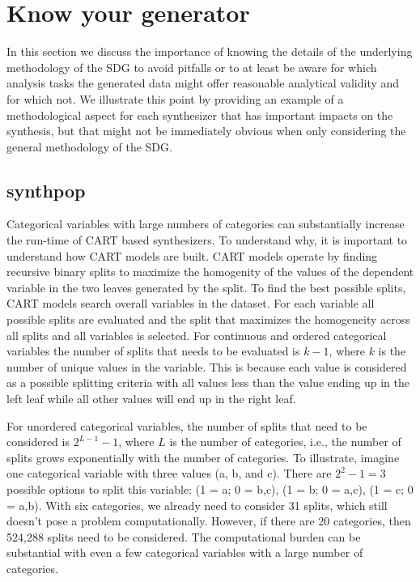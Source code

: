\documentclass[runningheads]{llncs}
\begin{document}
\section{Know your generator}\label{sec:know_your_generator}

In this section we discuss the importance of knowing the details of the underlying methodology of the SDG to avoid pitfalls or to at least be aware for which analysis tasks the generated data might offer reasonable analytical validity and for which not. We illustrate this point by providing an example of a methodological aspect for each synthesizer that has important impacts on the synthesis, but that might not be immediately obvious when only considering the general methodology of the SDG.  

\subsection{synthpop} 

Categorical variables with large numbers of categories can substantially increase the run-time of CART based synthesizers. To understand why, it is important to understand how CART models are built. CART models operate by finding recursive binary splits to maximize the homogenity of the values of the dependent variable in the two leaves generated by the split. To find the best possible splits, CART models search overall variables in the dataset. For each variable all possible splits are evaluated and the split that maximizes the homogeneity across all splits and all variables is selected. For continuous and ordered categorical variables the number of splits that needs to be evaluated is $k-1$, where $k$ is the number of unique values in the variable. This is because each value is considered as a possible splitting criteria with all values less than the value ending up in the left leaf while all other values will end up in the right leaf. 

For unordered categorical variables, the number of splits that need to be considered is $2^{L-1}-1$, where $L$ is the number of categories, i.e., the number of splits grows exponentially with the number of categories. To illustrate, imagine one categorical variable with three values (a, b, and c).  There are $2^2-1=3$ possible options to split this variable: (1 = a; 0 = b,c), (1 = b; 0 = a,c), (1 = c; 0 = a,b). With six categories, we already need to consider 31 splits, which still doesn't pose a problem computationally. However, if there are 20 categories, then 524,288 splits need to be considered.  The computational burden can be substantial with even a few categorical variables with a large number of categories.
\end{document}
